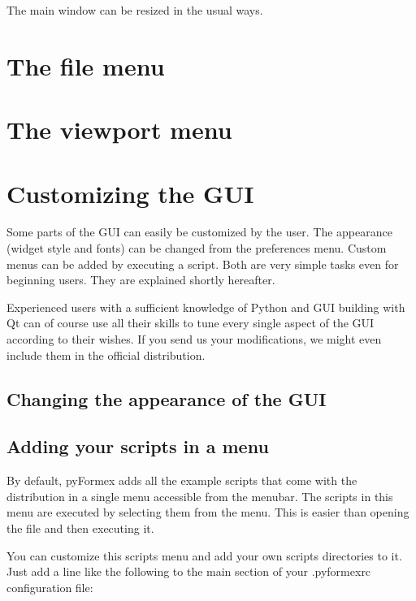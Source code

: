The \pyf main window can be resized in the usual ways. 

   
\section{The file menu}
\label{sec:file-menu}


   
\section{The viewport menu}
\label{sec:viewport-menu}



\section{Customizing the GUI}
\label{sec:customize-gui}

Some parts of the \pyformex GUI can easily be customized by the user. 
The appearance (widget style and fonts) can be changed from the preferences menu. Custom menus can be added by executing a script. Both are very simple tasks even for beginning users. They are explained shortly hereafter.

Experienced users with a sufficient knowledge of Python and GUI building with Qt can of course use all their skills to tune every single aspect of the \pyformex GUI according to their wishes. If you send us your modifications, we might even include them in the official distribution.


\subsection{Changing the appearance of the GUI}
\label{sec:chang-appe-gui}


\subsection{Adding your scripts in a menu}
\label{sec:adding-scripts-menu}
By default, pyFormex adds all the example scripts that come with the distribution in a single menu accessible from the menubar. The scripts in this menu are executed by selecting them from the menu. This is easier than opening the file and then executing it.

You can customize this scripts menu and add your own scripts directories to it.
Just add a line like the following to the main section of your .pyformexrc configuration file:\\

